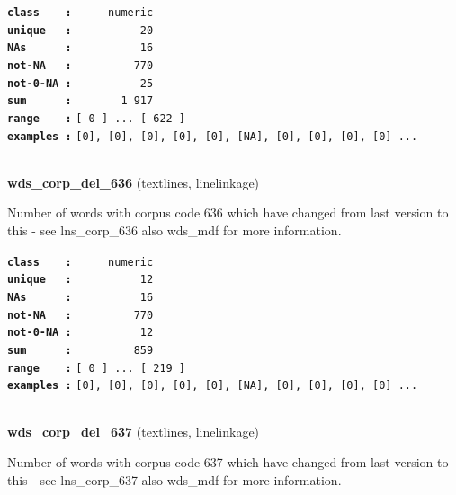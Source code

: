 \documentclass[]{article}
\begin{document}
\textbf{\texttt{class\ \ \ \ :}} \texttt{~~~~~numeric}\\
\textbf{\texttt{unique\ \ \ :}} \texttt{~~~~~~~~~~20}\\
\textbf{\texttt{NAs\ \ \ \ \ \ :}} \texttt{~~~~~~~~~~16}\\
\textbf{\texttt{not-NA\ \ \ :}} \texttt{~~~~~~~~~770}\\
\textbf{\texttt{not-0-NA\ :}} \texttt{~~~~~~~~~~25}\\
\textbf{\texttt{sum\ \ \ \ \ \ :}} \texttt{~~~~~~~1~917}\\
\textbf{\texttt{range\ \ \ \ :}}
\texttt{{[}\ 0\ {]}\ ...\ {[}\ 622\ {]}}\\
\textbf{\texttt{examples\ :}}
\texttt{{[}0{]},\ {[}0{]},\ {[}0{]},\ {[}0{]},\ {[}0{]},\ {[}NA{]},\ {[}0{]},\ {[}0{]},\ {[}0{]},\ {[}0{]}\ ...}\\

~

\textbf{wds\_corp\_del\_636} (textlines, linelinkage)

Number of words with corpus code 636 which have changed from last
version to this - see lns\_corp\_636 also wds\_mdf for more information.

\textbf{\texttt{class\ \ \ \ :}} \texttt{~~~~~numeric}\\
\textbf{\texttt{unique\ \ \ :}} \texttt{~~~~~~~~~~12}\\
\textbf{\texttt{NAs\ \ \ \ \ \ :}} \texttt{~~~~~~~~~~16}\\
\textbf{\texttt{not-NA\ \ \ :}} \texttt{~~~~~~~~~770}\\
\textbf{\texttt{not-0-NA\ :}} \texttt{~~~~~~~~~~12}\\
\textbf{\texttt{sum\ \ \ \ \ \ :}} \texttt{~~~~~~~~~859}\\
\textbf{\texttt{range\ \ \ \ :}}
\texttt{{[}\ 0\ {]}\ ...\ {[}\ 219\ {]}}\\
\textbf{\texttt{examples\ :}}
\texttt{{[}0{]},\ {[}0{]},\ {[}0{]},\ {[}0{]},\ {[}0{]},\ {[}NA{]},\ {[}0{]},\ {[}0{]},\ {[}0{]},\ {[}0{]}\ ...}\\

~

\textbf{wds\_corp\_del\_637} (textlines, linelinkage)

Number of words with corpus code 637 which have changed from last
version to this - see lns\_corp\_637 also wds\_mdf for more information.
\end{document}
